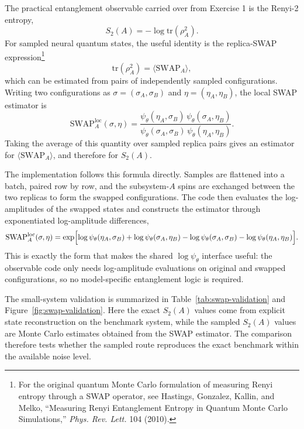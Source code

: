 \documentclass[11pt,a4paper]{article}
\begin{document}
The practical entanglement observable carried over from Exercise 1 is the Renyi-2 entropy,
\begin{equation}
    S_2(A) = -\log \mathrm{tr}(\rho_A^2).
\end{equation}
For sampled neural quantum states, the useful identity is the replica-SWAP expression\footnote{For the original quantum Monte Carlo formulation of measuring Renyi entropy through a SWAP operator, see Hastings, Gonzalez, Kallin, and Melko, ``Measuring Renyi Entanglement Entropy in Quantum Monte Carlo Simulations,'' \emph{Phys. Rev. Lett.} 104 (2010).}
\begin{equation}
    \mathrm{tr}(\rho_A^2)
    =
    \langle \mathrm{SWAP}_A \rangle,
\end{equation}
which can be estimated from pairs of independently sampled configurations. Writing two configurations as $\sigma = (\sigma_A,\sigma_B)$ and $\eta = (\eta_A,\eta_B)$, the local SWAP estimator is
\begin{equation}
    \mathrm{SWAP}_A^{\mathrm{loc}}(\sigma,\eta)
    =
    \frac{
        \psi_\theta(\eta_A,\sigma_B)\,
        \psi_\theta(\sigma_A,\eta_B)
    }{
        \psi_\theta(\sigma_A,\sigma_B)\,
        \psi_\theta(\eta_A,\eta_B)
    }.
\end{equation}
Taking the average of this quantity over sampled replica pairs gives an estimator for $\langle \mathrm{SWAP}_A \rangle$, and therefore for $S_2(A)$.

The implementation follows this formula directly. Samples are flattened into a batch, paired row by row, and the subsystem-$A$ spins are exchanged between the two replicas to form the swapped configurations. The code then evaluates the log-amplitudes of the swapped states and constructs the estimator through exponentiated log-amplitude differences,
\begin{equation}
    \mathrm{SWAP}_A^{\mathrm{loc}}(\sigma,\eta)
    =
    \exp \Bigl[
        \log \psi_\theta(\eta_A,\sigma_B)
        +
        \log \psi_\theta(\sigma_A,\eta_B)
        -
        \log \psi_\theta(\sigma_A,\sigma_B)
        -
        \log \psi_\theta(\eta_A,\eta_B)
    \Bigr].
\end{equation}
This is exactly the form that makes the shared $\log \psi_\theta$ interface useful: the observable code only needs log-amplitude evaluations on original and swapped configurations, so no model-specific entanglement logic is required.

The small-system validation is summarized in Table~\ref{tab:swap-validation} and Figure~\ref{fig:swap-validation}. Here the exact $S_2(A)$ values come from explicit state reconstruction on the benchmark system, while the sampled $S_2(A)$ values are Monte Carlo estimates obtained from the SWAP estimator. The comparison therefore tests whether the sampled route reproduces the exact benchmark within the available noise level.
\end{document}
